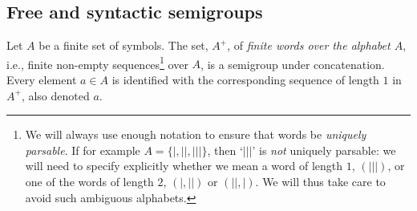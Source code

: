\subsection*{Free and syntactic semigroups}
Let $A$ be a finite set of symbols. The set, $A^+$, of \emph{finite words over the alphabet $A$}, i.e., finite non-empty sequences\footnote{We will always use enough notation to ensure that words be \emph{uniquely parsable}. If for example $A = \{|, ||, |||\}$, then `$|||$' is \emph{not} uniquely parsable: we will need to specify explicitly whether we mean a word of length $1$, $(|||)$, or one of the words of length $2$, $(|,||)$ or $(||,|)$. We will thus take care to avoid such ambiguous alphabets.} over $A$, is a semigroup under concatenation. Every element $a \in A$ is identified with the corresponding sequence of length $1$ in $A^+$, also denoted $a$.

